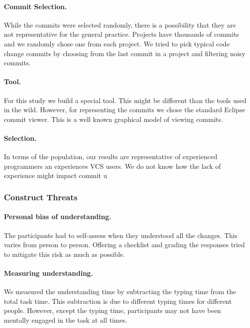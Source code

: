 \documentclass[letterpaper]{article}
\begin{document}
\paragraph{Commit Selection.}
While the commits were selected randomly, there is a possibility that they are not representative for the general practice.
Projects have thousands of commits and we randomly chose one from each project.
We tried to pick typical code change commits by choosing from the last commit in a project and filtering noisy commits.

\paragraph{Tool.}
For this study we build a special tool. 
This might be different than the tools used in the wild.
However, for representing the commits we chose the standard Eclipse commit viewer.
This is a well known graphical model of viewing commits.

\paragraph{Selection.}
In terms of the population, our results are representative of experienced programmers an experiences VCS users.
We do not know how the lack of experience might impact commit u

\subsubsection{Construct Threats}

\paragraph{Personal bias of understanding.}
The participants had to self-assess when they understood all the changes. 
This varies from person to person. 
Offering a checklist and grading the responses tried to mitigate this risk as much as possible.

\paragraph{Measuring understanding.}
We measured the understanding time by subtracting the typing time from the total task time.
This subtraction is due to different typing times for different people.
However, except the typing time, participants may not have been mentally engaged in the task at all times.
\end{document}
